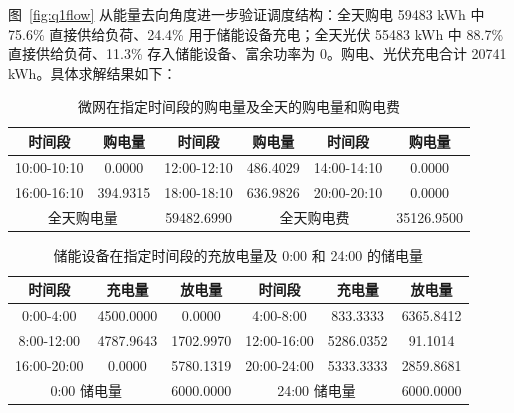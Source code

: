 \documentclass[withoutpreface,bwprint]{cumcmthesis}
\begin{document}
图~\ref{fig:q1flow} 从能量去向角度进一步验证调度结构：全天购电 59483 kWh 中 75.6\% 直接供给负荷、24.4\% 用于储能设备充电；全天光伏 55483 kWh 中 88.7\% 直接供给负荷、11.3\% 存入储能设备、富余功率为 0。购电、光伏充电合计 20741 kWh。具体求解结果如下：

\begin{table}[H]
	\centering
	\renewcommand{\arraystretch}{1.2}
	\setlength{\tabcolsep}{15pt}
	\footnotesize
	\caption{微网在指定时间段的购电量及全天的购电量和购电费}
	\label{tab:q1buy}
	\begin{tabular}{|c|c|c|c|c|c|}
		\hline
		时间段 & 购电量 & 时间段 & 购电量 & 时间段 & 购电量 \\ \hline
		10:00-10:10 & 0.0000 & 12:00-12:10 & 486.4029 & 14:00-14:10 & 0.0000 \\ \hline
		16:00-16:10 & 394.9315 & 18:00-18:10 & 636.9826 & 20:00-20:10 & 0.0000 \\ \hline
		\multicolumn{2}{|c|}{全天购电量} & 59482.6990 & \multicolumn{2}{c|}{全天购电费} & 35126.9500 \\ \hline
	\end{tabular}
\end{table}

\begin{table}[H]
	\centering
	\renewcommand{\arraystretch}{1.2}
	\setlength{\tabcolsep}{15pt}
	\footnotesize
	\caption{储能设备在指定时间段的充放电量及 0:00 和 24:00 的储电量}
	\label{tab:q1ess}
	\begin{tabular}{|c|c|c|c|c|c|}
		\hline
		时间段 & 充电量 & 放电量 & 时间段 & 充电量 & 放电量 \\ \hline
		0:00-4:00 & 4500.0000 & 0.0000 & 4:00-8:00 & 833.3333 & 6365.8412 \\ \hline
		8:00-12:00 & 4787.9643 & 1702.9970 & 12:00-16:00 & 5286.0352 & 91.1014 \\ \hline
		16:00-20:00 & 0.0000 & 5780.1319 & 20:00-24:00 & 5333.3333 & 2859.8681 \\ \hline
		\multicolumn{2}{|c|}{0:00 储电量} & 6000.0000 & \multicolumn{2}{c|}{24:00 储电量} & 6000.0000 \\ \hline
	\end{tabular}
\end{table}

\end{document}
